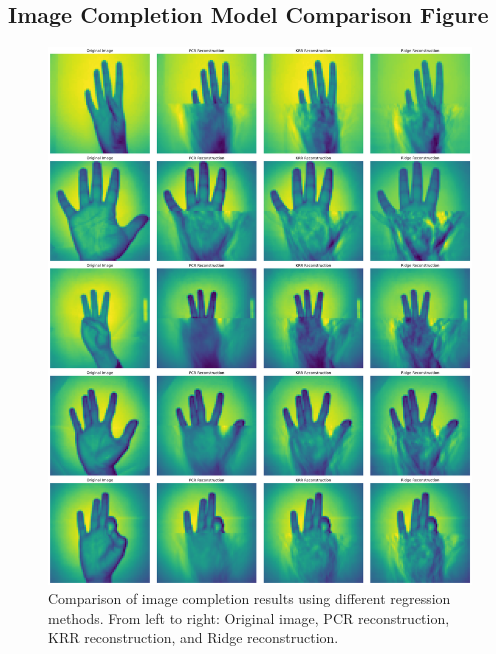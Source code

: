 \documentclass{article}
\begin{document}
\begin{appendices}
\newpage
\section{Image Completion Model Comparison Figure} \label{app:image_comparison}
\begin{figure}[h]
    \centering
    \includegraphics[width=\textwidth]{Task_2/image_completion_comparison.png}
    \caption{Comparison of image completion results using different regression methods. From left to right: Original image, PCR reconstruction, KRR reconstruction, and Ridge reconstruction.}
    \label{fig:completion_comparison}
\end{figure}

\end{appendices}
\end{document}
